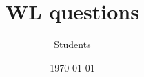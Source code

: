 \documentclass{exam}
\title{WL questions}
\date{\today}
\author{Students}
\begin{document}
\maketitle


\printanswers %


\end{document}
